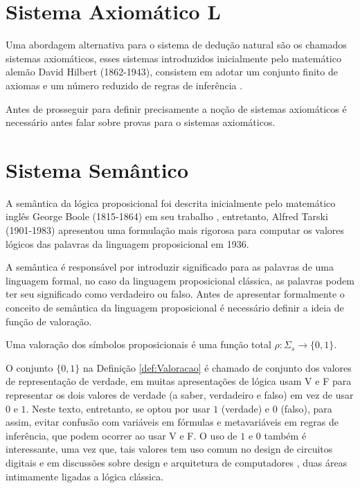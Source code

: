 \section{Sistema Axiomático L}\label{sec:SistemaAxiomatico}

Uma abordagem alternativa para o sistema de dedução natural são os chamados sistemas axiomáticos, esses sistemas introduzidos inicialmente pelo matemático alemão David Hilbert (1862-1943), consistem em adotar um conjunto finito de axiomas e um número reduzido de regras de inferência \cite{joaoPavao2014, sernadas2006}.

Antes de prosseguir para definir precisamente a noção de sistemas axiomáticos é necessário antes falar sobre provas para o sistemas axiomáticos.

\section{Sistema Semântico}\label{sec:SistemaSemantico}

A semântica da lógica proposicional foi descrita inicialmente pelo matemático inglês George Boole (1815-1864) em seu trabalho \cite{boole1854, boole1957}, entretanto, Alfred Tarski (1901-1983) apresentou uma formulação mais rigorosa para computar os valores lógicos das palavras da linguagem proposicional em 1936. 

A semântica é responsável por introduzir significado para as palavras de uma linguagem formal, no caso da linguagem proposicional clássica, as palavras podem ter seu significado como verdadeiro ou falso. Antes de apresentar formalmente o conceito de semântica da linguagem proposicional é necessário definir a ideia de função de  valoração.

\begin{definicao}[Valoração]\label{def:Valoracao}
  Uma valoração dos símbolos proposicionais é uma função total $\rho : \Sigma_s \rightarrow \{0,1\}$.
\end{definicao}

O conjunto $\{0,1\}$ na Definição \ref{def:Valoracao} é chamado de conjunto dos valores de representação de verdade, em muitas apresentações de lógica usam V e F para representar os dois valores de verdade (a saber, verdadeiro e falso) em vez de usar $0$ e $1$. Neste texto, entretanto, se optou por usar $1$ (verdade) e $0$ (falso), para assim, evitar confusão com variáveis em fórmulas e metavariáveis em regras de inferência, que podem ocorrer ao usar V e F. O uso de $1$ e $0$ também é interessante, uma vez que, tais valores tem uso comum no design de circuitos digitais \cite{capuano2018, holdsworth2002, lourencco1996} e em discussões sobre design e arquitetura de computadores \cite{murdocca2001, stallings2010}, duas áreas intimamente ligadas a lógica clássica.


